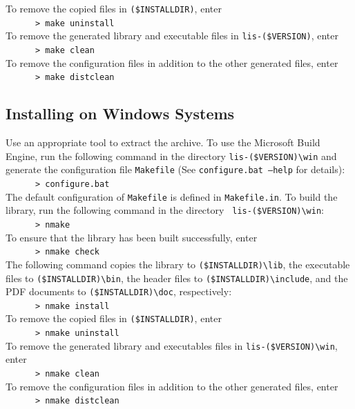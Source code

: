 \documentclass[a4paper]{article}
\begin{document}
To remove the copied files in {\tt (\$INSTALLDIR)}, enter 
\\
 \verb+      > make uninstall+\\
To remove the generated library and executable files
in {\tt lis-(\$VERSION)}, enter 
\\
 \verb+      > make clean+\\
To remove the configuration files in addition to the other
generated files, enter 
\\
 \verb+      > make distclean+

\subsection{Installing on Windows Systems}
Use an appropriate tool to extract the archive. 
To use the Microsoft Build Engine, run the following command in the directory 
{\tt lis-(\$VERSION)\textbackslash win} 
and generate the configuration file {\tt Makefile} (See {\tt configure.bat --help} 
for details): \\
 \verb+      > configure.bat+\\
The default configuration of {\tt Makefile} is defined in {\tt Makefile.in}.
To build the library, run the following command in the directory {\tt
lis-(\$VERSION)\textbackslash win}:\\
 \verb+      > nmake+\\
To ensure that the library has been built successfully, enter\\
 \verb+      > nmake check+\\
The following command copies
the library to {\tt (\$INSTALLDIR)\textbackslash lib}, 
the executable files to
{\tt (\$INSTALLDIR)\textbackslash bin},
the header files to
{\tt (\$INSTALLDIR)\textbackslash include},
and the PDF documents to
{\tt (\$INSTALLDIR)\textbackslash doc},
respectively:\\
 \verb+      > nmake install+\\
To remove the copied files in {\tt (\$INSTALLDIR)}, enter\\
 \verb+      > nmake uninstall+\\
To remove the generated library and executables files in
{\tt lis-(\$VERSION)\textbackslash win}, enter\\
 \verb+      > nmake clean+\\
To remove the configuration files in addition to the other
generated files, enter\\
\verb+      > nmake distclean+
\end{document}
